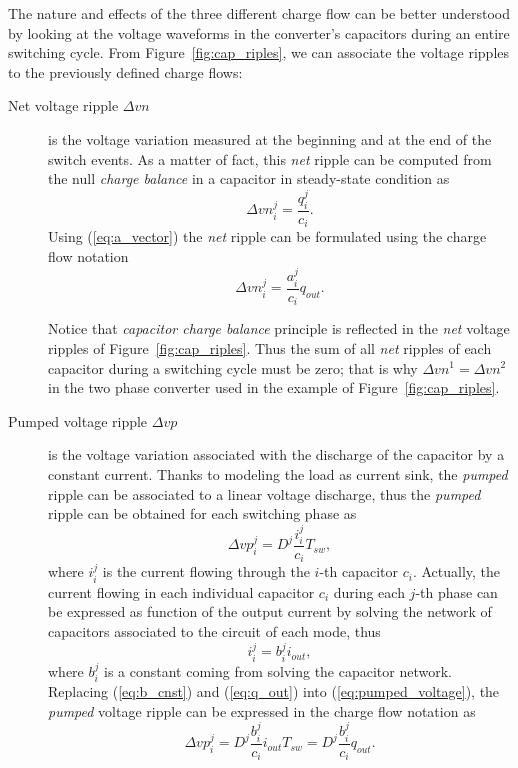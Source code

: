 The nature and effects of the three different charge flow can be better understood by looking at the voltage waveforms in the converter's capacitors during an entire switching cycle. From Figure~\ref{fig:cap_riples}, we can associate the voltage ripples to the previously defined charge flows:
\begin{description}
  \item[Net voltage ripple $\Delta vn$] is the voltage variation measured at the beginning and at the end of the switch events. As a matter of fact, this \emph{net} ripple can be computed from the null \emph{charge balance} in a capacitor in steady-state condition as
      \begin{equation}
        \Delta {vn}^j_i  = \frac{q_i ^j }{c_i}.
        \label{eq:net_voltage}
      \end{equation}
      Using (\ref{eq:a_vector}) the \emph{net} ripple can be formulated using the charge flow notation
      \begin{equation}
        \Delta {vn}^j_i  = \frac{a_i ^j }{c_i} {q_{out}}.
        \label{eq:net_voltage_cf}
      \end{equation}

      Notice that \emph{capacitor charge balance} principle is reflected in the \emph{net }voltage ripples of Figure~\ref{fig:cap_riples}. Thus the sum of all \emph{net} ripples of each capacitor during a switching cycle  must be zero; that is why $\Delta vn^1 = \Delta vn^2$ in the two phase converter used in the example of Figure~\ref{fig:cap_riples}.

  \item[Pumped voltage ripple $\Delta vp$] is the voltage variation associated with the discharge of the capacitor by a constant current. Thanks to modeling the load as current sink, the \emph{pumped} ripple can be associated to a linear voltage discharge, thus the \emph{pumped} ripple can be obtained for each switching phase as
      \begin{equation}
        \Delta {vp}^j_i  = D^j \frac{i_i^j}{c_i }T_{sw},
      \label{eq:pumped_voltage}
      \end{equation}
      where $i_i^j$ is the current flowing through the $i$-th capacitor $c_i$. Actually, the current flowing in each individual capacitor $c_i$ during each $j$-th phase can be expressed as function of the output current by solving the network of capacitors associated to the circuit of each mode, thus
      \begin{equation}
        i_i^j = b_i^j i_{out} ,
      \label{eq:b_cnst}
      \end{equation}
      where $ b_i^j $ is a constant coming from solving the capacitor network.  Replacing (\ref{eq:b_cnst}) and (\ref{eq:q_out}) into (\ref{eq:pumped_voltage}), the \emph{pumped} voltage ripple can be expressed in the charge flow notation as
      \begin{equation}
        \Delta {vp}^j_i  = D^j \frac{b_i^j}{c_i } {i_{out}} {T_{sw}} = D^j \frac{b_i^j}{c_i } {q_{out}}.
      \label{eq:pumped_voltage_cf}
      \end{equation}


\end{description}
